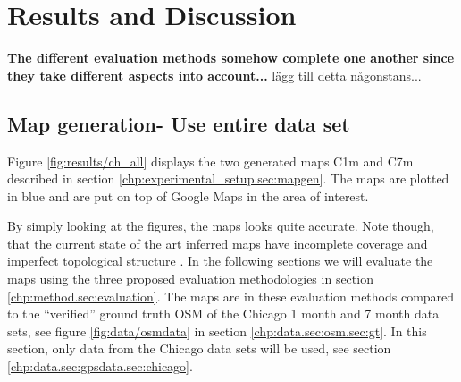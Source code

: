 \chapter{Results and Discussion}
\label{chp:results}

\textbf{The different evaluation methods somehow complete one another since they take different aspects into account...} lägg till detta någonstans...

\section{Map generation- Use entire data set}

Figure \ref{fig:results/ch_all} displays the two generated maps C1m and C7m described in section \ref{chp:experimental_setup.sec:mapgen}. The maps are plotted in blue and are put on top of Google Maps in the area of interest. 

By simply looking at the figures, the maps looks quite accurate. Note though, that the current state of the art inferred maps have incomplete coverage and imperfect topological structure \citep{fuse}. In the following sections we will evaluate the maps using the three proposed evaluation methodologies in section \ref{chp:method.sec:evaluation}. The maps are in these evaluation methods compared to the ``verified'' ground truth \ac{OSM} of the Chicago 1 month and 7 month data sets, see figure \ref{fig:data/osmdata} in section \ref{chp:data.sec:osm.sec:gt}. In this section, only data from the Chicago data sets will be used, see section \ref{chp:data.sec:gpsdata.sec:chicago}. 

